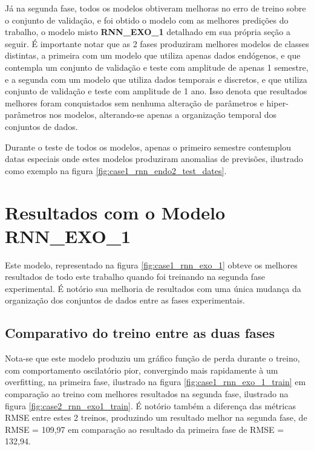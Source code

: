         Já na segunda fase, todos os modelos obtiveram melhoras no erro de treino sobre o conjunto de validação, e foi obtido o modelo com as melhores predições do trabalho, o modelo misto \textbf{RNN\_EXO\_1} detalhado em sua própria seção a seguir.
        É importante notar que as 2 fases produziram melhores modelos de classes distintas, a primeira com um modelo que utiliza apenas dados endógenos, e que contempla um conjunto de validação e teste com amplitude de apenas 1 semestre, e a segunda com um modelo que utiliza dados temporais e discretos, e que utiliza conjunto de validação e teste com amplitude de 1 ano.
        Isso denota que resultados melhores foram conquistados sem nenhuma alteração de parâmetros e hiper-parâmetros nos modelos, alterando-se apenas a organização temporal dos conjuntos de dados.
        
        Durante o teste de todos os modelos, apenas o primeiro semestre contemplou datas especiais onde estes modelos produziram anomalias de previsões, ilustrado como exemplo na figura \ref{fig:case1_rnn_endo2_test_dates}.

\section{Resultados com o Modelo RNN\_EXO\_1}
    Este modelo, representado na figura \ref{fig:case1_rnn_exo_1} obteve os melhores resultados de todo este trabalho quando foi treinando na segunda fase experimental.
    É notório sua melhoria de resultados com uma única mudança da organização dos conjuntos de dados entre as fases experimentais.
    
    \subsection{Comparativo do treino entre as duas fases}
     Nota-se que este modelo produziu um gráfico função de perda durante o treino, com comportamento oscilatório pior, convergindo mais rapidamente à um overfitting, na primeira fase, ilustrado na figura \ref{fig:case1_rnn_exo_1_train} em comparação ao treino com melhores resultados na segunda fase, ilustrado na figura \ref{fig:case2_rnn_exo1_train}. É notório também a diferença das métricas RMSE entre estes 2 treinos, produzindo um resultado melhor na segunda fase, de RMSE = 109,97 em comparação ao resultado da primeira fase de RMSE = 132,94.
     
